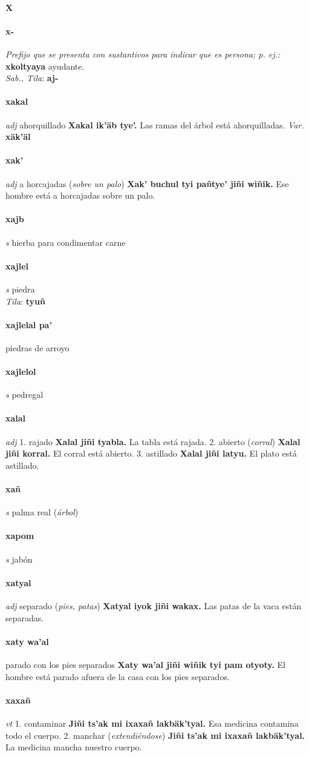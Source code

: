 \documentclass{scrbook}
\newcommand{\entry}[1]{\paragraph{#1}}
\newcommand{\alphaletter}[1]{\addsec{#1}}
\newcommand{\onedefinition}[1]{#1.}
\newcommand{\nontranslationdef}[1]{\textit{#1}}
\newcommand{\partofspeech}[1]{\textit{#1}}
\newcommand{\spanishtranslation}[1]{#1}
\newcommand{\clarification}[1]{(\textit{#1})}
\newcommand{\cholexample}[1]{\textbf{#1}}
\newcommand{\exampletranslation}[1]{#1}
\newcommand{\dialectvariant}[1]{\\\textit{#1}:}
\newcommand{\dialectword}[1]{\textbf{#1}}
\newcommand{\variation}[1]{\textit{Var.} \textbf{#1}}
\begin{document}
\begin{multicols}{2}
\entry{X}
\alphaletter{X}

\entry{x-}
\nontranslationdef{Prefijo que se presenta con sustantivos para indicar que es persona; p. ej.:}
\cholexample{xkoltyaya}
\exampletranslation{ayudante.}
\dialectvariant{Sab., Tila}
\dialectword{aj-}

\entry{xakal}
\partofspeech{adj}
\spanishtranslation{ahorquillado}
\cholexample{Xakal ik'äb tye'.}
\exampletranslation{Las ramas del árbol está ahorquilladas.}
\variation{xäk'äl}

\entry{xak'}
\partofspeech{adj}
\spanishtranslation{a horcajadas}
\clarification{sobre un palo}
\cholexample{Xak' buchul tyi pañtye' jiñi wiñik.}
\exampletranslation{Ese hombre está a horcajadas sobre un palo.}

\entry{xajb}
\partofspeech{s}
\spanishtranslation{hierba para condimentar carne}

\entry{xajlel}
\partofspeech{s}
\spanishtranslation{piedra}
\dialectvariant{Tila}
\dialectword{tyuñ}

\entry{xajlelal pa'}
\spanishtranslation{piedras de arroyo}

\entry{xajlelol}
\partofspeech{s}
\spanishtranslation{pedregal}

\entry{xalal}
\partofspeech{adj}
\onedefinition{1}
\spanishtranslation{rajado}
\cholexample{Xalal jiñi tyabla.}
\exampletranslation{La tabla está rajada.}
\onedefinition{2}
\spanishtranslation{abierto}
\clarification{corral}
\cholexample{Xalal jiñi korral.}
\exampletranslation{El corral está abierto.}
\onedefinition{3}
\spanishtranslation{astillado}
\cholexample{Xalal jiñi latyu.}
\exampletranslation{El plato está astillado.}

\entry{xañ}
\partofspeech{s}
\spanishtranslation{palma real}
\clarification{árbol}

\entry{xapom}
\partofspeech{s}
\spanishtranslation{jabón}

\entry{xatyal}
\partofspeech{adj}
\spanishtranslation{separado}
\clarification{pies, patas}
\cholexample{Xatyal iyok jiñi wakax.}
\exampletranslation{Las patas de la vaca están separadas.}

\entry{xaty wa'al}
\spanishtranslation{parado con los pies separados}
\cholexample{Xaty wa'al jiñi wiñik tyi pam otyoty.}
\exampletranslation{El hombre está parado afuera de la casa con los pies separados.}

\entry{xaxañ}
\partofspeech{vt}
\onedefinition{1}
\spanishtranslation{contaminar}
\cholexample{Jiñi ts'ak mi ixaxañ lakbäk'tyal.}
\exampletranslation{Esa medicina contamina todo el cuerpo.}
\onedefinition{2}
\spanishtranslation{manchar}
\clarification{extendiéndose}
\cholexample{Jiñi ts'ak mi ixaxañ lakbäk'tyal.}
\exampletranslation{La medicina mancha nuestro cuerpo.}


\end{multicols}
\end{document}
